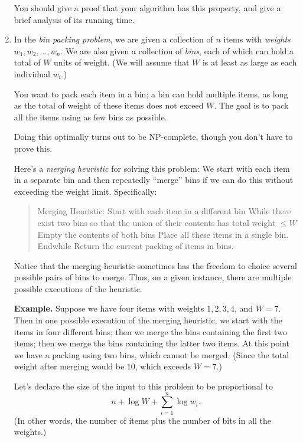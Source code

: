 \documentclass[12pt]{article}
\begin{document}
\begin{enumerate}
You should give a proof that your algorithm has this property,
and give a brief analysis of its running time.



\item 

In the {\em bin packing problem},
we are given a collection of $n$ items with
{\em weights} $w_1, w_2, \ldots, w_n$.
We are also given a collection of {\em bins},
each of which can hold a total of $W$ units of weight.
(We will assume that $W$ is at least as large as each individual $w_i$.)

You want to pack each item in a bin;
a bin can hold multiple items, as long
as the total of weight of these items does not exceed $W$.
The goal is to pack all the items using as few bins as possible.

Doing this optimally turns out to be NP-complete, though
you don't have to prove this.

\bigskip
Here's a {\em merging heuristic} for solving this problem:
We start with each item in a separate bin and then repeatedly
``merge'' bins if we can do this without exceeding the weight limit.
Specifically:
\begin{quote}
\begin{code}
Merging Heuristic:
  Start with each item in a different bin
  While there exist two bins so that the union of
        their contents has total weight $\leq W$
     Empty the contents of both bins
     Place all these items in a single bin.
  Endwhile
  Return the current packing of items in bins.
\end{code}
\end{quote}
Notice that the merging heuristic sometimes has
the freedom to choice several possible pairs of bins to merge.
Thus, on a given instance, there are multiple possible
executions of the heuristic.

\bigskip
{\bf Example.} Suppose we have four items with weights
$1, 2, 3, 4$, and $W = 7$.
Then in one possible execution of the merging heuristic, we
start with the items in four different bins;
then we merge the bins containing the first two items;
then we merge the bins containing the latter two items.
At this point we have a packing using two bins,
which cannot be merged.
(Since the total weight after merging would be $10$,
which exceeds $W = 7$.)

\bigskip
{} 
Let's declare the size of the
input to this problem to be proportional to
$$n + \log W + \sum_{i=1}^n \log w_i.$$
(In other words, the number of items plus
the number of bits in all the weights.)


\end{enumerate}
\end{document}
